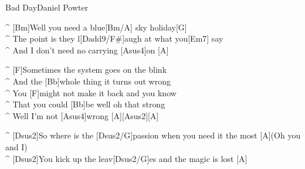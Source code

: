 \begin{song}{Bad Day}{Daniel Powter}
\begin{guitar}
\end{guitar}
\begin{guitar}
^ [Bm]Well you need a blue[Bm/A] sky holiday[G]\\
^ The point is they l[Dadd9/F#]augh at what you[Em7] say \\
^ And I don't need no carrying [Asus4]on [A]\\
\end{guitar}



\begin{guitar}
^ [F]Sometimes the system goes on the blink\\
^ And the [Bb]whole thing it turns out wrong \\
^ You [F]might not make it back and you know \\
^ That you could [Bb]be well oh that strong \\
^ Well I'm not [Asus4]wrong [A][Asus2][A]\\
\end{guitar}

\begin{guitar}
^ [Dsus2]So where is the [Dsus2/G]passion when you need it the most [A](Oh you and I)\\
^ [Dsus2]You kick up the leav[Dsus2/G]es and the magic is lost [A]\\
\end{guitar}


\end{song}
